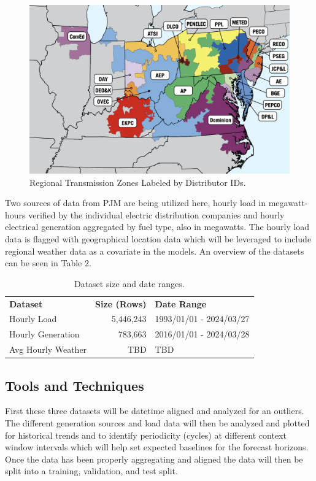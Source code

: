 \documentclass[sigconf]{acmart}
\begin{document}
  \begin{figure}
    \includegraphics[width=\columnwidth]{Images/Zones.png}
    \caption{Regional Transmission Zones Labeled by Distributor IDs.\protect \cite{PJM24}}
    \Description{}
    \label{fig:zone}
  \end{figure}
  
  Two sources of data from PJM are being utilized here, hourly load in megawatt-hours verified by the individual electric distribution companies and hourly electrical generation aggregated by fuel type, also in megawatts.\cite{PJMLoad24} The hourly load data is flagged with geographical location data which will be leveraged to include regional weather data as a covariate in the models. An overview of the datasets can be seen in Table 2.
  
\begin{table}[hbt!]
\centering
\caption{Dataset size and date ranges.}
\begin{tabular}{lrl}
\toprule
\textbf{Dataset} & \hfil \textbf{Size (Rows)} & \textbf{Date Range} \\
\cmidrule(rl){1-1}\cmidrule(rl){2-2}\cmidrule(rl){3-3}
  Hourly Load & 5,446,243 & 1993/01/01 - 2024/03/27 \\
  Hourly Generation & 783,663 & 2016/01/01 - 2024/03/28 \\   
  Avg Hourly Weather & TBD & TBD  \\   
  \bottomrule
\end{tabular}
\end{table}

  \subsection{Tools and Techniques}
  First these three datasets will be datetime aligned and analyzed for an outliers. The different generation sources and load data will then be analyzed and plotted for historical trends and to identify periodicity (cycles) at different context window intervals which will help set expected baselines for the forecast horizons. Once the data has been properly aggregating and aligned the data will then be split into a training, validation, and test split.
\end{document}
